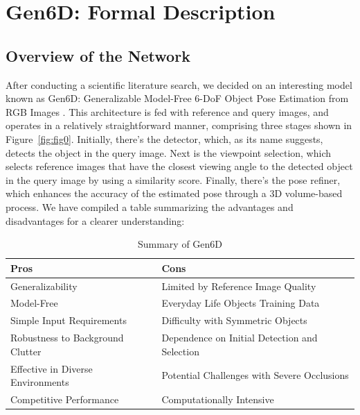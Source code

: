 
\chapter{Gen6D: Formal Description}\label{chapter:gen6d_formal_description}

\section{Overview of the Network}
After conducting a scientific literature search, we decided on an interesting model known as Gen6D: Generalizable Model-Free 6-\ac{DoF} Object Pose Estimation from RGB Images \cite{liu2023gen6d}. This architecture is fed with reference and query images, and operates in a relatively straightforward manner, comprising three stages shown in Figure~\ref{fig:fig0}. Initially, there's the detector, which, as its name suggests, detects the object in the query image. Next is the viewpoint selection, which selects reference images that have the closest viewing angle to the detected object in the query image by using a similarity score. Finally, there's the pose refiner, which enhances the accuracy of the estimated pose through a 3D volume-based process. We have compiled a table summarizing the advantages and disadvantages for a clearer understanding:

\bigskip

\begin{table}[htpb]
  \caption[Example table]{Summary of Gen6D}\label{tab:sample}
  \centering
  \small
  \begin{tabular}{l | l}
    \toprule
      Pros & Cons \\
    \midrule
      Generalizability & Limited by Reference Image Quality \\
      Model-Free & Everyday Life Objects Training Data \\
      Simple Input Requirements & Difficulty with Symmetric Objects \\
      Robustness to Background Clutter & Dependence on Initial Detection and Selection \\
      Effective in Diverse Environments & Potential Challenges with Severe Occlusions \\
      Competitive Performance & Computationally Intensive \\
    \bottomrule
  \end{tabular}
  \label{tab:tab}
\end{table}

